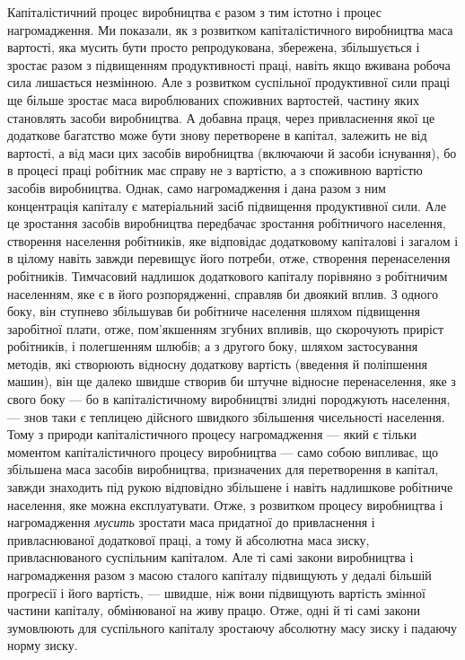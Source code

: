 Капіталістичний процес виробництва є разом з тим істотно і
процес нагромадження. Ми показали, як з розвитком капіталістичного
виробництва маса вартості, яка мусить бути просто
репродукована, збережена, збільшується і зростає разом з
підвищенням продуктивності праці, навіть якщо вживана робоча
сила лишається незмінною. Але з розвитком суспільної продуктивної
сили праці ще більше зростає маса вироблюваних споживних
вартостей, частину яких становлять засоби виробництва.
А добавна праця, через привласнення якої це додаткове багатство
може бути знову перетворене в капітал, залежить не від вартості,
а від маси цих засобів виробництва (включаючи й засоби
існування), бо в процесі праці робітник має справу не з вартістю,
а з споживною вартістю засобів виробництва. Однак, само
нагромадження і дана разом з ним концентрація капіталу є
матеріальний засіб підвищення продуктивної сили. Але це зростання
засобів виробництва передбачає зростання робітничого
населення, створення населення робітників, яке відповідає додатковому
капіталові і загалом і в цілому навіть завжди перевищує
його потреби, отже, створення перенаселення робітників.
Тимчасовий надлишок додаткового капіталу порівняно з робітничим
населенням, яке є в його розпорядженні, справляв би
двоякий вплив. З одного боку, він ступнево збільшував би робітниче
населення шляхом підвищення заробітної плати, отже,
пом’якшенням згубних впливів, що скорочують приріст робітників,
і полегшенням шлюбів; а з другого боку, шляхом застосування
методів, які створюють відносну додаткову вартість (введення
й поліпшення машин), він ще далеко швидше створив би
штучне відносне перенаселення, яке з свого боку — бо в капіталістичному
виробництві злидні породжують населення, — знов таки є
теплицею дійсного швидкого збільшення чисельності населення.
Тому з природи капіталістичного процесу нагромадження —
який є тільки моментом капіталістичного процесу виробництва —
само собою випливає, що збільшена маса засобів виробництва,
призначених для перетворення в капітал, завжди знаходить під
рукою відповідно збільшене і навіть надлишкове робітниче населення,
яке можна експлуатувати. Отже, з розвитком процесу
виробництва і нагромадження \emph{мусить} зростати маса придатної
до привласнення і привласнюваної додаткової праці, а тому й абсолютна
маса зиску, привласнюваного суспільним капіталом. Але ті
самі закони виробництва і нагромадження разом з масою сталого
капіталу підвищують у дедалі більшій прогресії і його вартість, —
швидше, ніж вони підвищують вартість змінної частини капіталу,
обмінюваної на живу працю. Отже, одні й ті самі закони зумовлюють
для суспільного капіталу зростаючу абсолютну масу
зиску і падаючу норму зиску.

